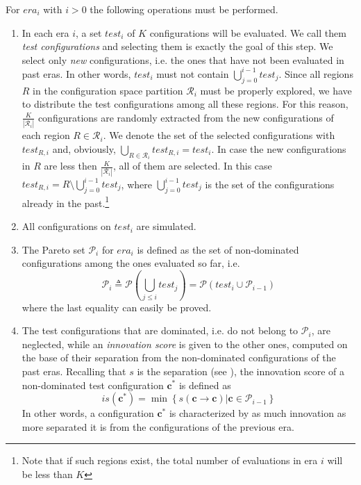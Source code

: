 For $era_{i}$ with $i>0$ the following operations must be performed.
\begin{enumerate}
\item \label{pers02.enu:K}
In each era $i$, a set $test_i$ of $K$ configurations will be evaluated. We call them \emph{test configurations} and selecting them is exactly the goal of this step.
We select only \emph{new} configurations, i.e. the ones that have not been evaluated in past eras. In other words, $test_i$ must not contain $\bigcup_{j=0}^{i-1}test_{j}$.
Since all regions $R$ in the configuration space partition $\mathcal{R}_{i}$ must be properly explored, we have to distribute the test configurations among all these regions. For this reason, $\frac{K}{\left|\mathcal{R}_{i}\right|}$ configurations are randomly extracted from the new configurations of each region $R\in\mathcal{R}_{i}$. We denote the set of the selected configurations with $test_{R,i}$ and, obviously, $\bigcup_{R\in\mathcal{R}_{i}} test_{R,i} = test_i$.
 In case the new configurations in $R$ are less then $\frac{K}{\left|\mathcal{R}_{i}\right|}$, all of them are selected. In this case $test_{R,i}=R\setminus\bigcup_{j=0}^{i-1}test_{j}$, where  $\bigcup_{j=0}^{i-1}test_{j}$ is the set of the configurations already in the past.\footnote{Note that if such regions exist, the total number of evaluations in era $i$ will be less than $K$}
\item All configurations on $test_{i}$ are simulated.
\item The Pareto set $\mathscr{P}_{i}$ for $era_{i}$ is defined as the set of non-dominated configurations among the ones evaluated so far, i.e.
	\[
	\mathscr{P}_{i} \triangleq
	\mathscr{P}\left(\bigcup_{j\leq i}test_j\right)=
	\mathscr{P}\left(test_{i}\cup\mathscr{P}_{i-1}\right)
	\]
where the last equality can easily be proved.

\item \label{pers02.enu:novelty_score_of_a_configuration}
The test configurations that are dominated, i.e. do not belong to $\mathscr{P}_i$, are neglected, while an \emph{innovation score} is given to the other ones, computed on the base of their separation from the non-dominated configurations of the past eras. Recalling that $s$ is the separation (see ), the innovation score of a non-dominated test configuration $\mathbf{c}^*$ is defined as
	\[
	is\left(\mathbf{c}^*\right)=\min\left\{ \left.s\left(\mathbf{c}\rightarrow\mathbf{c} \right)\right|\mathbf{c}\in\mathscr{P}_{i-1}\right\} 
	\]
In other words, a configuration $\mathbf{c}^*$ is characterized by as much innovation
as more separated it is from the configurations of the previous era.


\end{enumerate}
